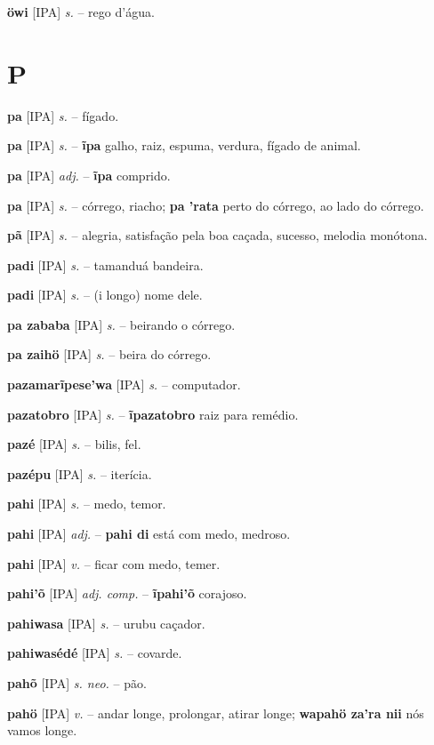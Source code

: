 \textbf{öwi} [IPA] \textit{s.} -- rego d'água.


\section*{P}



\textbf{pa} [IPA] \textit{s.} -- fígado.

\textbf{pa} [IPA] \textit{s.} -- \textbf{ĩpa} galho, raiz, espuma, verdura, fígado de animal.

\textbf{pa} [IPA] \textit{adj.} -- \textbf{ĩpa} comprido.

\textbf{pa} [IPA] \textit{s.} -- córrego, riacho; \textbf{pa 'rata} perto do córrego, ao lado do córrego.

\textbf{pã} [IPA] \textit{s.} -- alegria, satisfação pela boa caçada, sucesso, melodia monótona.

\textbf{padi} [IPA] \textit{s.} -- tamanduá bandeira.

\textbf{padi} [IPA] \textit{s.} -- (i longo) nome dele.

\textbf{pa zababa} [IPA] \textit{s.} -- beirando o córrego.

\textbf{pa zaihö} [IPA] \textit{s.} -- beira do córrego.

\textbf{pazamarĩpese'wa} [IPA] \textit{s.} -- computador.

\textbf{pazatobro} [IPA] \textit{s.} -- \textbf{ĩpazatobro} raiz para remédio.

\textbf{pazé} [IPA] \textit{s.} -- bilis, fel.

\textbf{pazépu} [IPA] \textit{s.} -- iterícia.

\textbf{pahi} [IPA] \textit{s.} -- medo, temor.

\textbf{pahi} [IPA] \textit{adj.} -- \textbf{pahi di} está com medo, medroso.

\textbf{pahi} [IPA] \textit{v.} -- ficar com medo, temer.

\textbf{pahi'õ} [IPA] \textit{adj. comp.} -- \textbf{ĩpahi'õ} corajoso.

\textbf{pahiwasa} [IPA] \textit{s.} -- urubu caçador.

\textbf{pahiwasédé} [IPA] \textit{s.} -- covarde.

\textbf{pahõ} [IPA] \textit{s. neo.} -- pão.

\textbf{pahö} [IPA] \textit{v.} -- andar longe, prolongar, atirar longe; \textbf{wapahö za'ra nii} nós vamos longe.

